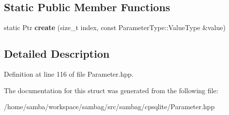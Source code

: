 \subsection*{Static Public Member Functions}
\begin{DoxyCompactItemize}
\item 
\hypertarget{structsambag_1_1cpsqlite_1_1_text_parameter_a8036861518b06be3f78f5ee9f8dd7b16}{
static Ptr {\bfseries create} (size\_\-t index, const ParameterType::ValueType \&value)}
\label{structsambag_1_1cpsqlite_1_1_text_parameter_a8036861518b06be3f78f5ee9f8dd7b16}

\end{DoxyCompactItemize}


\subsection{Detailed Description}


Definition at line 116 of file Parameter.hpp.



The documentation for this struct was generated from the following file:\begin{DoxyCompactItemize}
\item 
/home/samba/workspace/sambag/src/sambag/cpsqlite/Parameter.hpp\end{DoxyCompactItemize}
